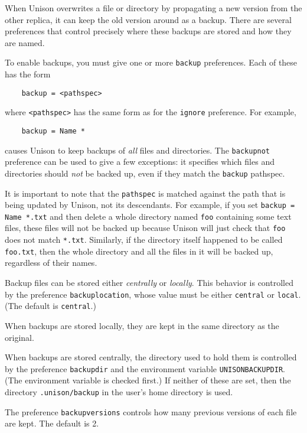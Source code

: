\documentclass{article}
\begin{document}

When Unison overwrites a file or directory by propagating a new version from
the other replica, it can keep the old version around as a backup.  There
are several preferences that control precisely where these backups are
stored and how they are named.

To enable backups, you must give one or more \verb|backup| preferences.
Each of these has the form
\begin{verbatim}
    backup = <pathspec>
\end{verbatim}
where \verb|<pathspec>| has the same form as for the \verb|ignore|
preference.  For example, 
\begin{verbatim}
    backup = Name *
\end{verbatim}
causes Unison to keep backups of {\em all} files and directories.  The
\verb|backupnot| preference can be used to give a few exceptions: it
specifies which files and directories should {\em not} be backed up, even if
they match the \verb|backup| pathspec. 

It is important to note that the \verb|pathspec| is matched against the path
that is being updated by Unison, not its descendants.  For example, if you
set \verb|backup = Name *.txt| and then delete a whole directory named
\verb|foo| containing some text files, these files will not be backed up
because Unison will just check that \verb|foo| does not match \verb|*.txt|.
Similarly, if the directory itself happened to be called \verb|foo.txt|,
then the whole directory and all the files in it will be backed up,
regardless of their names. 

Backup files can be stored either {\em centrally} or {\em locally}.  This
behavior is controlled by the preference \verb|backuplocation|, whose value
must be either \verb|central| or \verb|local|.  (The default is
\verb|central|.)  

When backups are stored locally, they are kept in the same
directory as the original.

When backups are stored centrally, the directory used to hold them is
controlled by the preference \verb|backupdir| and the
environment variable \verb|UNISONBACKUPDIR|.  (The environment variable is
checked first.)  If neither of these are set, then the directory
\verb|.unison/backup| in the user's home directory is used.

The preference \verb|backupversions| controls how many previous versions of
each file are kept.  The default is 2.
\end{document}
